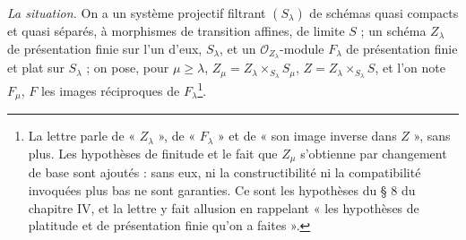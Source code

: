 \documentclass[11pt,a4paper]{article}
\begin{document}
\emph{La situation.} On a un système projectif filtrant $(S_\lambda)$ de
schémas quasi compacts et quasi séparés, à morphismes de transition affines,
de limite $S$ ; un schéma $Z_\lambda$ de présentation finie sur l'un d'eux,
$S_\lambda$, et un $\mathcal{O}_{Z_\lambda}$-module $F_\lambda$ de présentation
finie et plat sur $S_\lambda$ ; on pose, pour $\mu \geq \lambda$,
$Z_\mu = Z_\lambda \times_{S_\lambda} S_\mu$, $Z = Z_\lambda \times_{S_\lambda}
S$, et l'on note $F_\mu$, $F$ les images réciproques de
$F_\lambda$\footnote{La lettre parle de « $Z_\lambda$ », de « $F_\lambda$ »
et de « son image inverse dans $Z$ », sans plus. Les hypothèses de finitude et
le fait que $Z_\mu$ s'obtienne par changement de base sont ajoutés : sans eux,
ni la constructibilité ni la compatibilité invoquées plus bas ne sont
garanties. Ce sont les hypothèses du § 8 du chapitre IV, et la lettre y fait
allusion en rappelant « les hypothèses de platitude et de présentation finie
qu'on a faites ».}.
\end{document}
